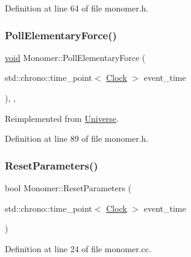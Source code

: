 Definition at line 64 of file monomer.\+h.

\mbox{\label{class_monomer_a5b2375df1e19abdf6045c475d2ac23ca}} 
\subsubsection{\texorpdfstring{Poll\+Elementary\+Force()}{PollElementaryForce()}}
{\footnotesize\ttfamily \mbox{\hyperlink{glad_8h_a950fc91edb4504f62f1c577bf4727c29}{void}} Monomer\+::\+Poll\+Elementary\+Force (\begin{DoxyParamCaption}\item[{std\+::chrono\+::time\+\_\+point$<$ \mbox{\hyperlink{universe_8h_a0ef8d951d1ca5ab3cfaf7ab4c7a6fd80}{Clock}} $>$}]{event\+\_\+time }\end{DoxyParamCaption})\hspace{0.3cm}{\ttfamily [inline]}, {\ttfamily [final]}, {\ttfamily [virtual]}}



Reimplemented from \mbox{\hyperlink{class_universe_a0c485c504542409cbb5cfd8543c35b11}{Universe}}.



Definition at line 89 of file monomer.\+h.

\mbox{\label{class_monomer_a16a692cf11117581c9b4ebbed3c04c9c}} 
\subsubsection{\texorpdfstring{Reset\+Parameters()}{ResetParameters()}}
{\footnotesize\ttfamily bool Monomer\+::\+Reset\+Parameters (\begin{DoxyParamCaption}\item[{std\+::chrono\+::time\+\_\+point$<$ \mbox{\hyperlink{universe_8h_a0ef8d951d1ca5ab3cfaf7ab4c7a6fd80}{Clock}} $>$}]{event\+\_\+time }\end{DoxyParamCaption})}



Definition at line 24 of file monomer.\+cc.

